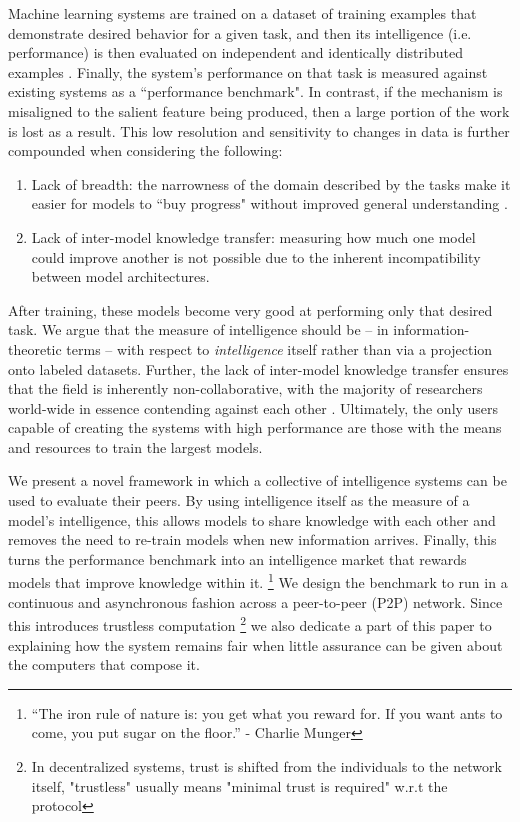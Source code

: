 \documentclass{article}
\begin{document}
Machine learning systems are trained on a dataset of training examples that demonstrate desired behavior for a given task, and then its intelligence (i.e. performance) is then evaluated on independent and identically distributed examples \cite{radford2019language, chollet2019measure}. Finally, the system's performance on that task is measured against existing systems as a ``performance benchmark". In contrast, if the mechanism is misaligned to the salient feature being produced, then a large portion of the work is lost as a result. This low resolution and sensitivity to changes in data is further compounded when considering the following:

\begin{enumerate}
	\item Lack of breadth: the narrowness of the domain described by the tasks make it easier for models to ``buy progress" without improved general understanding \cite{chollet2019measure}.
	\item Lack of inter-model knowledge transfer: measuring how much one model could improve another is not possible due to the inherent incompatibility between model architectures. 
\end{enumerate}

After training, these models become very good at performing only that desired task. We argue that the measure of intelligence should be -- in information-theoretic terms -- with respect to \textit{intelligence} itself rather than via a projection onto labeled datasets. Further, the lack of inter-model knowledge transfer ensures that the field is inherently non-collaborative, with the majority of researchers world-wide in essence contending against each other \cite{Riabinin2020learningathome}. Ultimately, the only users capable of creating the systems with high performance are those with the means and resources to train the largest models.

We present a novel framework in which a collective of intelligence systems can be used to evaluate their peers. By using intelligence itself as the measure of a model's intelligence, this allows models to share knowledge with each other and removes the need to re-train models when new information arrives. Finally, this turns the performance benchmark into an intelligence market that rewards models that improve knowledge within it. \footnote{“The iron rule of nature is: you get what you reward for. If you want ants to come, you put sugar on the floor.” - Charlie Munger} We design the benchmark to run in a continuous and asynchronous fashion across a peer-to-peer (P2P) network. Since this introduces trustless computation \footnote{ In decentralized systems, trust is shifted from the individuals to the network itself, "trustless" usually means "minimal trust is required" w.r.t the protocol} we also dedicate a part of this paper to explaining how the system remains fair when little assurance can be given about the computers that compose it. 
\end{document}
